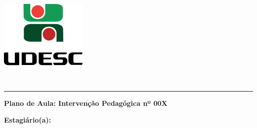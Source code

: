 \documentclass[
	12pt,				%
	openright,			%
	oneside,			%
	a4paper,			%
	chapter=TITLE,		%
	english,			%
	brazil				%
]{abntex2}
\begin{document}
\thispagestyle{empty}
\begin{center}
	\begin{minipage}[!]{\linewidth}
        \begin{minipage}[!]{.19\linewidth}
            \includegraphics[width=\linewidth]{img/logo.png}           
        \end{minipage}
        \begin{minipage}[!]{.8\linewidth}
            \center
            \ABNTEXchapterfont\normalsize\MakeUppercase{\imprimirinstituicao}
            \par
            \vspace*{10pt}                     
            \ABNTEXchapterfont\normalsize\MakeUppercase{\centro}
            \par
            \vspace*{10pt}           
            \ABNTEXchapterfont\normalsize\MakeUppercase{\disciplina}
        \end{minipage}        
    \end{minipage}
    \\ \vspace{0.5cm}
    \rule{\textwidth}{.5pt}   
\end{center}
    \textual
    \begin{center}
    \textbf{Plano de Aula: Intervenção Pedagógica nº 00X}
    \par\end{center}
    
    \noindent \textbf{Estagiário(a): }\imprimirautor 
    
\end{document}
